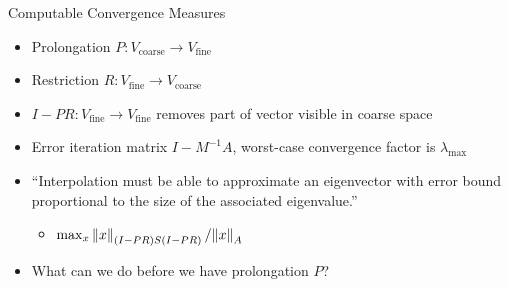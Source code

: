 \begin{frame}{Computable Convergence Measures}
\newcommand\Vcoarse{V_{\text{coarse}}}
\newcommand\Vfine{V_{\text{fine}}}
  \begin{itemize}
  \item Prolongation $P: \Vcoarse \to \Vfine$
  \item Restriction $R: \Vfine \to \Vcoarse$
  \item $I - PR: \Vfine \to \Vfine$ removes part of vector visible in coarse space
  \item Error iteration matrix $I - M^{-1}A$, worst-case convergence factor is $\lambda_{\max}$
  \item ``Interpolation must be able to approximate an eigenvector with error bound proportional to the size of the associated eigenvalue.''
    \begin{itemize}
    \item $\max_x \left\lVert x \right\rVert_{(I-PR)S(I-PR)}/{\left\lVert x \right\rVert_A}$
    \end{itemize}
  \item What can we do before we have prolongation $P$?
  \end{itemize}
\end{frame}
